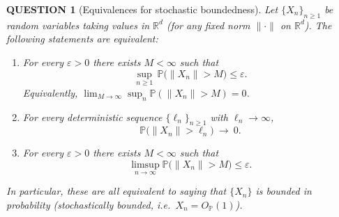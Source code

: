 \documentclass[12pt]{article}
\renewcommand{\(}{\left(}%
\renewcommand{\)}{\right)}%
\renewcommand{\[}{\left[}%
\renewcommand{\]}{\right]}%
\newtheorem{question}{QUESTION}[section]}
\begin{document}
\begin{question}[Equivalences for stochastic boundedness]
Let $\{X_n\}_{n\ge1}$ be random variables taking values in $\mathbb{R}^d$ (for any fixed norm $\|\cdot\|$ on $\mathbb{R}^d$). The following statements are equivalent:

\begin{enumerate}
\item[(1)] For every $\varepsilon>0$ there exists $M<\infty$ such that
\begin{equation*}
\sup_{n\ge1}\,\mathbb{P}\big(\|X_n\|>M\big)\le \varepsilon.
\end{equation*}
Equivalently, $\lim_{M\to\infty}\sup_{n}\mathbb{P}(\|X_n\|>M)=0$.

\item[(2)] For every deterministic sequence $\{\ell_n\}_{n\ge1}$ with $\ell_n\to\infty$,
\begin{equation*}
\mathbb{P}\big(\|X_n\|>\ell_n\big)\ \longrightarrow\ 0.
\end{equation*}

\item[(3)] For every $\varepsilon>0$ there exists $M<\infty$ such that
\begin{equation*}
\limsup_{n\to\infty}\mathbb{P}\big(\|X_n\|>M\big)\le \varepsilon.
\end{equation*}
\end{enumerate}
In particular, these are all equivalent to saying that $\{X_n\}$ is bounded in probability (stochastically bounded, i.e.\ $X_n=O_{\mathbb{P}}(1)$).
\end{question}
\end{document}
